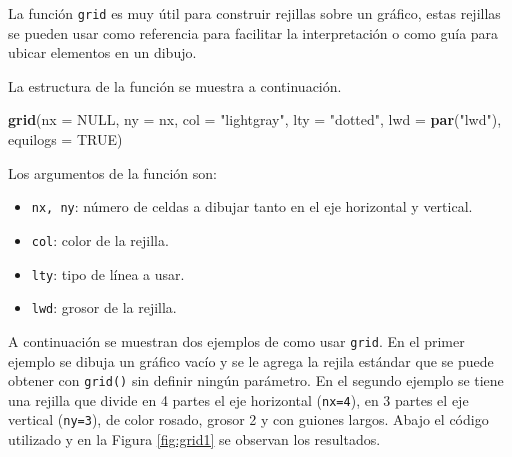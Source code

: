 \documentclass[10pt,]{krantz}
\makeatletter
\newenvironment{Shaded}{\begin{snugshade}}{\end{snugshade}}
\newcommand{\KeywordTok}[1]{\textcolor[rgb]{0.13,0.29,0.53}{\textbf{{#1}}}}
\newcommand{\DataTypeTok}[1]{\textcolor[rgb]{0.13,0.29,0.53}{{#1}}}
\newcommand{\StringTok}[1]{\textcolor[rgb]{0.31,0.60,0.02}{{#1}}}
\newcommand{\OtherTok}[1]{\textcolor[rgb]{0.56,0.35,0.01}{{#1}}}
\newcommand{\NormalTok}[1]{{#1}}
\providecommand{\tightlist}{%
  \setlength{\itemsep}{0pt}\setlength{\parskip}{0pt}}
\newenvironment{kframe}{%
\medskip{}
\setlength{\fboxsep}{.8em}
 \def\at@end@of@kframe{}%
 \ifinner\ifhmode%
  \def\at@end@of@kframe{\end{minipage}}%
  \begin{minipage}{\columnwidth}%
 \fi\fi%
 \def\FrameCommand##1{\hskip\@totalleftmargin \hskip-\fboxsep
 \colorbox{shadecolor}{##1}\hskip-\fboxsep
     \hskip-\linewidth \hskip-\@totalleftmargin \hskip\columnwidth}%
 \MakeFramed {\advance\hsize-\width
   \@totalleftmargin\z@ \linewidth\hsize
   \@setminipage}}%
 {\par\unskip\endMakeFramed%
 \at@end@of@kframe}
\renewenvironment{Shaded}{\begin{kframe}}{\end{kframe}}
\makeatother
\begin{document}
La función \texttt{grid} es muy útil para construir rejillas sobre un
gráfico, estas rejillas se pueden usar como referencia para facilitar la
interpretación o como guía para ubicar elementos en un dibujo.

La estructura de la función se muestra a continuación.

\begin{Shaded}
\begin{Highlighting}[]
\KeywordTok{grid}\NormalTok{(}\DataTypeTok{nx =} \OtherTok{NULL}\NormalTok{, }\DataTypeTok{ny =} \NormalTok{nx, }\DataTypeTok{col =} \StringTok{"lightgray"}\NormalTok{, }\DataTypeTok{lty =} \StringTok{"dotted"}\NormalTok{,}
     \DataTypeTok{lwd =} \KeywordTok{par}\NormalTok{(}\StringTok{"lwd"}\NormalTok{), }\DataTypeTok{equilogs =} \OtherTok{TRUE}\NormalTok{)}
\end{Highlighting}
\end{Shaded}

Los argumentos de la función son:

\begin{itemize}
\tightlist
\item
  \texttt{nx,\ ny}: número de celdas a dibujar tanto en el eje
  horizontal y vertical.
\item
  \texttt{col}: color de la rejilla.
\item
  \texttt{lty}: tipo de línea a usar.
\item
  \texttt{lwd}: grosor de la rejilla.
\end{itemize}

A continuación se muestran dos ejemplos de como usar \texttt{grid}. En
el primer ejemplo se dibuja un gráfico vacío y se le agrega la rejila
estándar que se puede obtener con \texttt{grid()} sin definir ningún
parámetro. En el segundo ejemplo se tiene una rejilla que divide en 4
partes el eje horizontal (\texttt{nx=4}), en 3 partes el eje vertical
(\texttt{ny=3}), de color rosado, grosor 2 y con guiones largos. Abajo
el código utilizado y en la Figura \ref{fig:grid1} se observan los
resultados.
\end{document}
